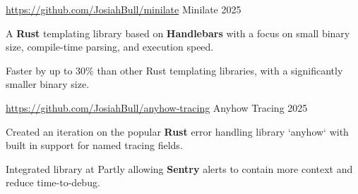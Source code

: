 
\begin{cventries}

  \cventry
    {\href{https://github.com/JosiahBull/minilate}{\faLink \space https://github.com/JosiahBull/minilate}}
    {Minilate}
    {}
    {2025}
    {
      \begin{cvitems}
        \item {A \textbf{Rust} templating library based on \textbf{Handlebars} with a focus on small binary size, compile-time parsing, and execution speed.}
        \item {Faster by up to 30\% than other Rust templating libraries, with a significantly smaller binary size.}
      \end{cvitems}
    }

  \cventry
    {\href{https://github.com/JosiahBull/anyhow-tracing}{\faLink \space https://github.com/JosiahBull/anyhow-tracing}}
    {Anyhow Tracing}
    {}
    {2025}
    {
      \begin{cvitems}
        \item {Created an iteration on the popular \textbf{Rust} error handling library `anyhow` with built in support for named tracing fields.}
        \item {Integrated library at Partly allowing \textbf{Sentry} alerts to contain more context and reduce time-to-debug.}
      \end{cvitems}
    }



\end{cventries}
